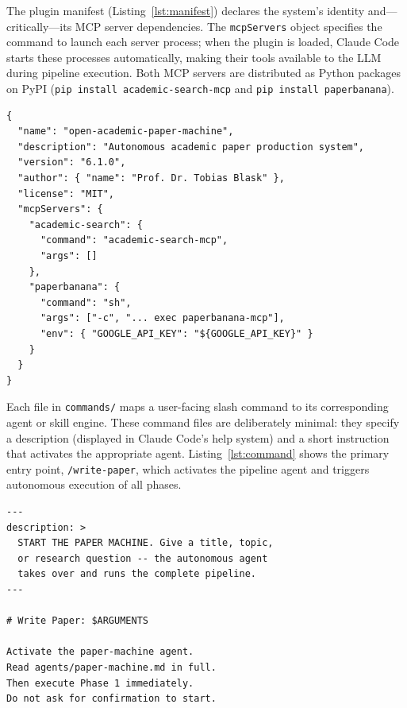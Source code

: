 \documentclass{article}
\begin{document}
The plugin manifest (Listing~\ref{lst:manifest}) declares the system's identity and---critically---its MCP server dependencies. The \texttt{mcpServers} object specifies the command to launch each server process; when the plugin is loaded, Claude Code starts these processes automatically, making their tools available to the LLM during pipeline execution. Both MCP servers are distributed as Python packages on PyPI (\texttt{pip install academic-search-mcp} and \texttt{pip install paperbanana}).

\begin{lstlisting}[caption={Plugin manifest (\texttt{plugin.json}) declaring two MCP server dependencies. The \texttt{mcpServers} object maps server names to launch commands; Claude Code starts these processes when the plugin is loaded.},label={lst:manifest},float=t]
{
  "name": "open-academic-paper-machine",
  "description": "Autonomous academic paper production system",
  "version": "6.1.0",
  "author": { "name": "Prof. Dr. Tobias Blask" },
  "license": "MIT",
  "mcpServers": {
    "academic-search": {
      "command": "academic-search-mcp",
      "args": []
    },
    "paperbanana": {
      "command": "sh",
      "args": ["-c", "... exec paperbanana-mcp"],
      "env": { "GOOGLE_API_KEY": "${GOOGLE_API_KEY}" }
    }
  }
}
\end{lstlisting}

Each file in \texttt{commands/} maps a user-facing slash command to its corresponding agent or skill engine. These command files are deliberately minimal: they specify a description (displayed in Claude Code's help system) and a short instruction that activates the appropriate agent. Listing~\ref{lst:command} shows the primary entry point, \texttt{/write-paper}, which activates the pipeline agent and triggers autonomous execution of all phases.

\begin{lstlisting}[caption={The \texttt{/write-paper} command file---the primary entry point that activates the pipeline agent. The \texttt{\$ARGUMENTS} placeholder captures the user's research topic.},label={lst:command},float=t]
---
description: >
  START THE PAPER MACHINE. Give a title, topic,
  or research question -- the autonomous agent
  takes over and runs the complete pipeline.
---

# Write Paper: $ARGUMENTS

Activate the paper-machine agent.
Read agents/paper-machine.md in full.
Then execute Phase 1 immediately.
Do not ask for confirmation to start.
\end{lstlisting}
\end{document}
